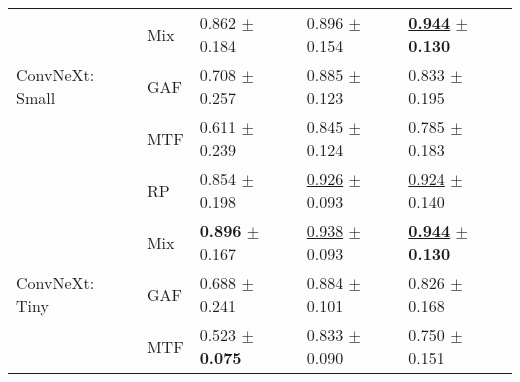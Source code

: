 \begin{tabular}{lllll}
 & Mix & \textcolor[rgb]{0.0787824530,0.5000000000,0}{0.862} $\pm$ \textcolor[rgb]{0.5941088240,0.4058911760,0}{0.184} & \textcolor[rgb]{0.3348930481,0.5000000000,0}{0.896} $\pm$ \textcolor[rgb]{0.9311751943,0.0688248057,0}{0.154} & \underline{\textbf{\textcolor[rgb]{0.0000000000,0.5000000000,0}{0.944}}} $\pm$ \textbf{\textcolor[rgb]{0.0000000000,0.5000000000,0}{0.130}} \\
ConvNeXt: Small & GAF & \textcolor[rgb]{0.4431512981,0.5000000000,0}{0.708} $\pm$ \textcolor[rgb]{1.0000000000,0.0000000000,0}{0.257} & \textcolor[rgb]{0.4059714795,0.5000000000,0}{0.885} $\pm$ \textcolor[rgb]{0.5007263060,0.4992736940,0}{0.123} & \textcolor[rgb]{0.4000000000,0.5000000000,0}{0.833} $\pm$ \textcolor[rgb]{0.4683369943,0.5000000000,0}{0.195} \\
 & MTF & \textcolor[rgb]{0.6729334527,0.3270665473,0}{0.611} $\pm$ \textcolor[rgb]{0.8999515496,0.1000484504,0}{0.239} & \textcolor[rgb]{0.6510695187,0.3489304813,0}{0.845} $\pm$ \textcolor[rgb]{0.5159088943,0.4840911057,0}{0.124} & \textcolor[rgb]{0.5750000000,0.4250000000,0}{0.785} $\pm$ \textcolor[rgb]{0.3827984820,0.5000000000,0}{0.183} \\
 & RP & \textcolor[rgb]{0.0984780662,0.5000000000,0}{0.854} $\pm$ \textcolor[rgb]{0.6747481909,0.3252518091,0}{0.198} & \underline{\textcolor[rgb]{0.1510695187,0.5000000000,0}{0.926}} $\pm$ \textcolor[rgb]{0.0999682822,0.5000000000,0}{0.093} & \underline{\textcolor[rgb]{0.0750000000,0.5000000000,0}{0.924}} $\pm$ \textcolor[rgb]{0.0718829596,0.5000000000,0}{0.140} \\
 & Mix & \textbf{\textcolor[rgb]{0.0000000000,0.5000000000,0}{0.896}} $\pm$ \textcolor[rgb]{0.5039453787,0.4960546213,0}{0.167} & \underline{\textcolor[rgb]{0.0775401070,0.5000000000,0}{0.938}} $\pm$ \textcolor[rgb]{0.0931749808,0.5000000000,0}{0.093} & \underline{\textbf{\textcolor[rgb]{0.0000000000,0.5000000000,0}{0.944}}} $\pm$ \textbf{\textcolor[rgb]{0.0000000000,0.5000000000,0}{0.130}} \\
ConvNeXt: Tiny & GAF & \textcolor[rgb]{0.4923903312,0.5000000000,0}{0.688} $\pm$ \textcolor[rgb]{0.9113745311,0.0886254689,0}{0.241} & \textcolor[rgb]{0.4108734403,0.5000000000,0}{0.884} $\pm$ \textcolor[rgb]{0.2082138349,0.5000000000,0}{0.101} & \textcolor[rgb]{0.4250000000,0.5000000000,0}{0.826} $\pm$ \textcolor[rgb]{0.2789740494,0.5000000000,0}{0.168} \\
 & MTF & \textcolor[rgb]{0.8818263205,0.1181736795,0}{0.523} $\pm$ \textbf{\textcolor[rgb]{0.0000000000,0.5000000000,0}{0.075}} & \textcolor[rgb]{0.7295008913,0.2704991087,0}{0.833} $\pm$ \textcolor[rgb]{0.0562553209,0.5000000000,0}{0.090} & \textcolor[rgb]{0.7000000000,0.3000000000,0}{0.750} $\pm$ \textcolor[rgb]{0.1516428390,0.5000000000,0}{0.151} \\

\end{tabular}
